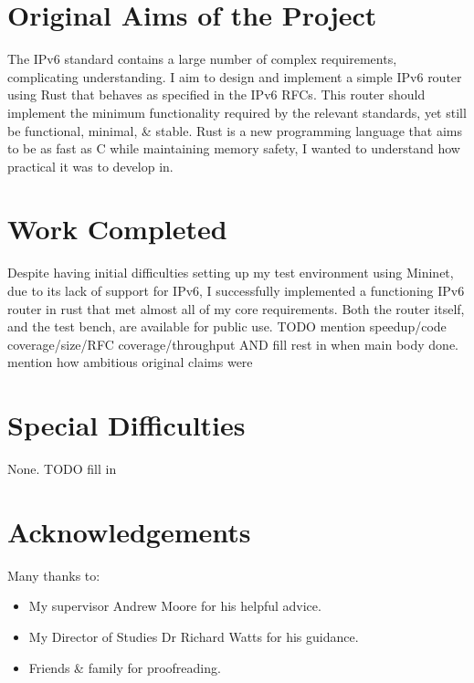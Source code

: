 \documentclass[12pt,a4paper,twoside,openright]{report}
\begin{document}
\section*{Original Aims of the Project}

The IPv6 standard contains a large number of complex requirements, complicating understanding. I aim to design and implement a simple IPv6 router using Rust\cite{rust} that behaves as specified in the IPv6 RFCs\cite{ipv6_rfc}. This router should implement the minimum functionality required by the relevant standards, yet still be functional, minimal, \& stable.  Rust is a new programming language that aims to be as fast as C while maintaining memory safety, I wanted to understand how practical it was to develop in.

\section*{Work Completed}

Despite having initial difficulties setting up my test environment using Mininet\cite{mininet}, due to its lack of support for IPv6, I successfully implemented a functioning IPv6 router in rust that met almost all of my core requirements. Both the router itself, and the test bench, are available for public use.  TODO mention speedup/code coverage/size/RFC coverage/throughput AND fill rest in when main body done. mention how ambitious original claims were

\section*{Special Difficulties}

None. TODO fill in

\tableofcontents

\listoffigures

\newpage
\section*{Acknowledgements}

Many thanks to:
\begin{itemize}
\item My supervisor Andrew Moore for his helpful advice.
\item My Director of Studies Dr Richard Watts for his guidance.
\item Friends \& family for proofreading.
\end{itemize}
\end{document}
